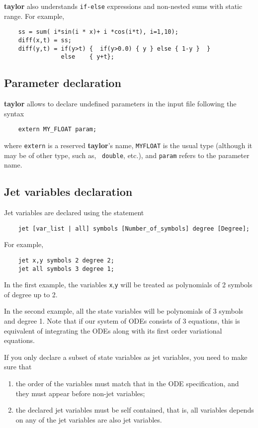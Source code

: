 \documentclass[10pt]{article}
\theoremstyle{remark}
\newcommand{\taylorname}{{\bf taylor}}
\newcommand{\myfloat}{{\tt MY\symbol{95}FLOAT}}
\begin{document}
\medskip 

\taylorname{} also understands {\tt if-else} expressions and
non-nested sums with static range. For example,
\begin{verbatim}
    ss = sum( i*sin(i * x)+ i *cos(i*t), i=1,10);
    diff(x,t) = ss;
    diff(y,t) = if(y>t) {  if(y>0.0) { y } else { 1-y }  }
                else    { y+t};
\end{verbatim}

\subsection*{Parameter declaration}
\taylorname{} allows to declare undefined parameters in the input file
following the syntax
\begin{verbatim}
    extern MY_FLOAT param;
\end{verbatim}
where {\tt extern} is a reserved \taylorname{}'s name, \myfloat{} is
the usual type (although it may be of other type, such as, {\tt
  double}, etc.), and {\tt param} refers to the parameter name.

\subsection*{Jet variables declaration}
Jet variables are declared using the statement
\begin{verbatim}
    jet [var_list | all] symbols [Number_of_symbols] degree [Degree];
\end{verbatim}
For example,
\begin{verbatim}
    jet x,y symbols 2 degree 2;
    jet all symbols 3 degree 1;
\end{verbatim}
In the first example, the variables {\tt x},{\tt y} will be treated as
polynomials of 2 symbols of degree up to 2.

In the second example, all the state variables will be polynomials of
3 symbols and degree 1. Note that if our system of ODEs consists of 3
equations, this is equivalent of integrating the ODEs along with its
first order variational equations.

\bigskip

If you only declare a subset of state variables as jet variables, you
need to make sure that
\begin{enumerate}
\renewcommand{\theenumi}{A\arabic{enumi}}
\renewcommand{\labelenumi}{\theenumi.)}
    \item\label{A1} the order of the variables must match that in the
      ODE specification, and they must appear before non-jet
      variables;
    \item\label{A2} the declared jet variables must be self contained,
      that is, all variables depends on any of the jet variables are
      also jet variables.
\end{enumerate}
\end{document}

